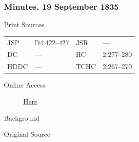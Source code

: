 		\subsubsection{Minutes, 19 September 1835}
			\label{EMS-1835-JS-19-SEP-1835}
			
			\begin{description}
				\item[Print Sources]
			\end{description}

				\begin{tabular}{p{0.5in}p{1in}p{0.5in}p{1in}}
				JSP	 	& D4:422--427		& JSR 		& --- \\
				DC	 	& --- 				& HC 		& 2:277--280 \\
				HDDC 	& ---				& TCHC 		& 2:267--270 \\
				\end{tabular}
			
			\begin{description}
				\item[Online Access] \href{https://www.josephsmithpapers.org/paper-summary/minutes-19-september-1835/1}{Here}
			\end{description}
			
			\begin{description}
				\item[Background]
			\end{description}
			
			
			\begin{description}
				\item[Original Source]
			\end{description}
			
			
